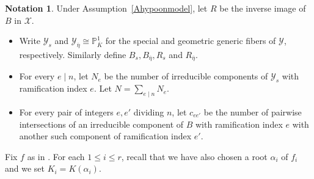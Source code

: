 \documentclass[12pt]{amsart}
\numberwithin{equation}{section}
\theoremstyle{definition}
\newtheorem{remark}[equation]{Remark}
\newtheorem{notation}[equation]{Notation}
\newcommand{\padma}[1]{{\color{Magenta} \sf $\clubsuit\clubsuit\clubsuit$ Padma: [#1]}}
\newcommand{\ol}[1]{\overline{#1}}
\newcommand{\mc}[1]{\mathcal{#1}}
\renewcommand{\P}{\mathbb P}
\newcommand{\proj}{\mathbb P}
\begin{document}
 \begin{notation}\label{Nmodel} Under Assumption~\ref{Ahypoonmodel},
   let $R$ be the inverse image of $B$ in $\mc{X}$.
  \begin{itemize}
 \item Write $\mc{Y}_s$ and $\mc{Y}_{\ol{\eta}} \cong \proj^1_{\ol{K}}$ for the special and geometric generic fibers of $\mc{Y}$, respectively. Similarly define $B_s,B_{\ol{\eta}},R_s$ and $R_{\ol{\eta}}$.
 \item For every $e \mid n$, let $N_e$ be the number of irreducible components of $\mc{Y}_s$ with ramification index $e$. Let $N = \sum_{e \mid n} N_e$. 
 \item For every pair of integers $e,e'$ dividing $n$, let $c_{ee'}$
   be the number of pairwise intersections of an irreducible component
   of $B$ with ramification index $e$ with
   another such component of ramification index $e'$. 
\end{itemize}



Fix $f$ as in . For each $1 \leq i \leq
r$, recall that we have also chosen a root $\alpha_i$ of $f_i$ and we set $K_i = K(\alpha_i)$.
 \end{notation}
\end{document}
